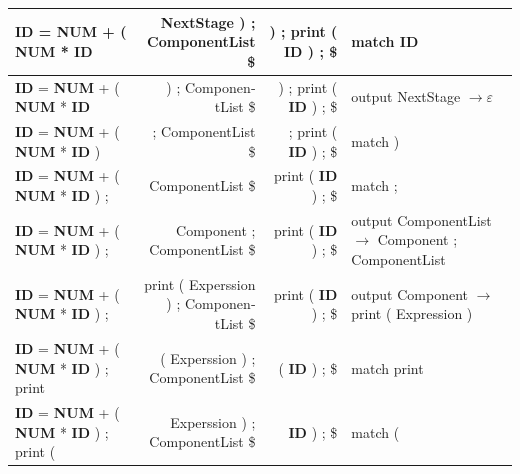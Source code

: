 \documentclass{article}
\begin{document}
\begin{latin}
\begin{table}[H]
{\begin{tabular}{|l|r|r|l|}
\textbf{ID} = \textbf{NUM} + ( \textbf{NUM} * \textbf{ID}                             & NextStage ) ; ComponentList \$              & ) ; print ( \textbf{ID} ) ; \$                                                           & match \textbf{ID}                                               \\ \hline
\textbf{ID} = \textbf{NUM} + ( \textbf{NUM} * \textbf{ID}                             & ) ; ComponentList \$                        & ) ; print ( \textbf{ID} ) ; \$                                                           & output NextStage $\longrightarrow \varepsilon$                   \\ \hline
\textbf{ID} = \textbf{NUM} + ( \textbf{NUM} * \textbf{ID} )                           & ; ComponentList \$                          & ; print ( \textbf{ID} ) ; \$                                                             & match )                                                         \\ \hline
\textbf{ID} = \textbf{NUM} + ( \textbf{NUM} * \textbf{ID} ) ;                         & ComponentList \$                            & print ( \textbf{ID} ) ; \$                                                               & match ;                                                         \\ \hline
\textbf{ID} = \textbf{NUM} + ( \textbf{NUM} * \textbf{ID} ) ;                         & Component ; ComponentList \$                & print ( \textbf{ID} ) ; \$                                                               & output ComponentList $\longrightarrow$ Component ; ComponentList \\ \hline
\textbf{ID} = \textbf{NUM} + ( \textbf{NUM} * \textbf{ID} ) ;                         & print ( Experssion ) ; ComponentList \$     & print ( \textbf{ID} ) ; \$                                                               & output Component $\longrightarrow$ print ( Expression )          \\ \hline
\textbf{ID} = \textbf{NUM} + ( \textbf{NUM} * \textbf{ID} ) ; print                   & ( Experssion ) ; ComponentList \$           & ( \textbf{ID} ) ; \$                                                                     & match print                                                     \\ \hline
\textbf{ID} = \textbf{NUM} + ( \textbf{NUM} * \textbf{ID} ) ; print (                 & Experssion ) ; ComponentList \$             & \textbf{ID} ) ; \$                                                                       & match (                                                         \\ \hline

\end{tabular}}
\end{table}
\end{latin}
\end{document}
